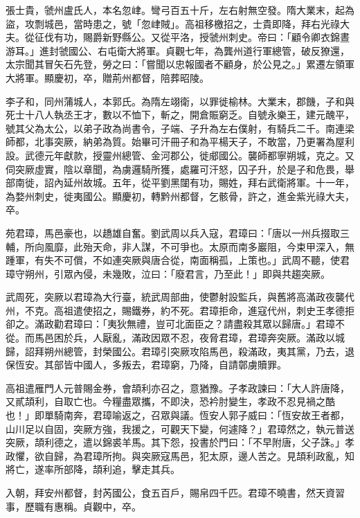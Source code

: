 \begin{pinyinscope}
 張士貴，虢州盧氏人，本名忽峍。彎弓百五十斤，左右射無空發。隋大業末，起為盜，攻剽城邑，當時患之，號「忽峍賊」。高祖移檄招之，士貴即降，拜右光祿大夫。從征伐有功，賜爵新野縣公。又從平洛，授虢州刺史。帝曰：「顧令卿衣錦晝游耳。」進封虢國公、右屯衛大將軍。貞觀七年，為龔州道行軍總管，破反獠還，太宗聞其冒矢石先登，勞之曰：「嘗聞以忠報國者不顧身，於公見之。」累遷左領軍大將軍。顯慶初，卒，贈荊州都督，陪葬昭陵。



 李子和，同州蒲城人，本郭氏。為隋左翊衛，以罪徙榆林。大業末，郡饑，子和與死士十八人執丞王才，數以不恤下，斬之，開倉賑窮乏。自號永樂王，建元醜平，號其父為太公，以弟子政為尚書令，子端、子升為左右僕射，有騎兵二千。南連梁師都，北事突厥，納弟為質。始畢可汗冊子和為平楊天子，不敢當，乃更署為屋利設。武德元年獻款，授靈州總管、金河郡公，徙郕國公。襲師都寧朔城，克之。又伺突厥虛實，陰以章聞，為虜邏騎所獲，處羅可汗怒，囚子升，於是子和危畏，舉部南徙，詔內延州故城。五年，從平劉黑闥有功，賜姓，拜右武衛將軍。十一年，為婺州刺史，徙夷國公。顯慶初，轉黔州都督，乞骸骨，許之，進金紫光祿大夫，卒。



 苑君璋，馬邑豪也，以趫雄自奮。劉武周以兵入寇，君璋曰：「唐以一州兵掇取三輔，所向風靡，此殆天命，非人謀，不可爭也。太原而南多巖阻，今束甲深入，無踵軍，有失不可償，不如連突厥與唐合從，南面稱孤，上策也。」武周不聽，使君璋守朔州，引眾內侵，未幾敗，泣曰：「廢君言，乃至此！」即與共趨突厥。



 武周死，突厥以君璋為大行臺，統武周部曲，使鬱射設監兵，與舊將高滿政夜襲代州，不克。高祖遣使招之，賜鐵券，約不死。君璋拒命，進寇代州，刺史王孝德拒卻之。滿政勸君璋曰：「夷狄無禮，豈可北面臣之？請盡殺其眾以歸唐。」君璋不從。而馬邑困於兵，人厭亂，滿政因眾不忍，夜脅君璋，君璋奔突厥。滿政以城歸，詔拜朔州總管，封榮國公。君璋引突厥攻陷馬邑，殺滿政，夷其黨，乃去，退保恆安。其部皆中國人，多叛去，君璋窮，乃降，自請鄣虜贖罪。



 高祖遣雁門人元普賜金券，會頡利亦召之，意猶豫。子孝政諫曰：「大人許唐降，又貳頡利，自取亡也。今糧盡眾攜，不即決，恐衿肘變生，孝政不忍見禍之酷也！」即單騎南奔，君璋喻返之，召眾與議。恆安人郭子威曰：「恆安故王者都，山川足以自固，突厥方強，我援之，可觀天下變，何遽降？」君璋然之，執元普送突厥，頡利德之，遣以錦裘羊馬。其下怨，投書於門曰：「不早附唐，父子誅。」孝政懼，欲自歸，為君璋所拘。與突厥寇馬邑，犯太原，邊人苦之。見頡利政亂，知將亡，遂率所部降，頡利追，擊走其兵。



 入朝，拜安州都督，封芮國公，食五百戶，賜帛四千匹。君璋不曉書，然天資習事，歷職有惠稱。貞觀中，卒。




\end{pinyinscope}

